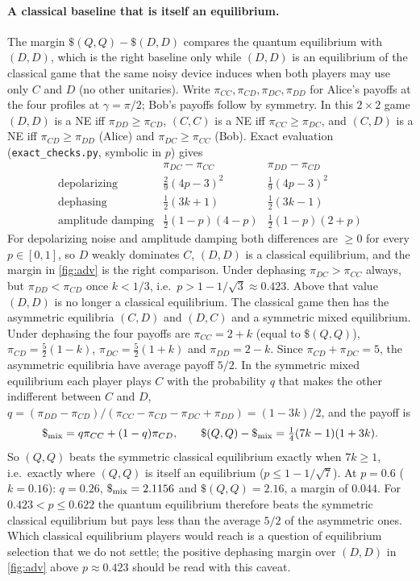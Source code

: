 \documentclass[11pt,a4paper]{article}
\begin{document}
\paragraph{A classical baseline that is itself an equilibrium.} The margin $\$(Q,Q)-\$(D,D)$ compares the quantum equilibrium with $(D,D)$, which is the right baseline only while $(D,D)$ is an equilibrium of the classical game that the same noisy device induces when both players may use only $C$ and $D$ (no other unitaries). Write $\pi_{CC},\pi_{CD},\pi_{DC},\pi_{DD}$ for Alice's payoffs at the four profiles at $\gamma=\pi/2$; Bob's payoffs follow by symmetry. In this $2\times2$ game $(D,D)$ is a NE iff $\pi_{DD}\ge \pi_{CD}$, $(C,C)$ is a NE iff $\pi_{CC}\ge \pi_{DC}$, and $(C,D)$ is a NE iff $\pi_{CD}\ge \pi_{DD}$ (Alice) and $\pi_{DC}\ge \pi_{CC}$ (Bob). Exact evaluation (\texttt{exact\_checks.py}, symbolic in $p$) gives
\[
\begin{array}{lcc}
 & \pi_{DC}-\pi_{CC} & \pi_{DD}-\pi_{CD}\\[2pt]
\text{depolarizing} & \frac29(4p-3)^2 & \frac19(4p-3)^2\\[2pt]
\text{dephasing} & \frac12(3k+1) & \frac12(3k-1)\\[2pt]
\text{amplitude damping} & \frac12(1-p)(4-p) & \frac12(1-p)(2+p)
\end{array}
\]
For depolarizing noise and amplitude damping both differences are $\ge0$ for every $p\in[0,1]$, so $D$ weakly dominates $C$, $(D,D)$ is a classical equilibrium, and the margin in \cref{fig:adv} is the right comparison. Under dephasing $\pi_{DC}>\pi_{CC}$ always, but $\pi_{DD}<\pi_{CD}$ once $k<1/3$, i.e.\ $p>1-1/\sqrt3\approx0.423$. Above that value $(D,D)$ is no longer a classical equilibrium. The classical game then has the asymmetric equilibria $(C,D)$ and $(D,C)$ and a symmetric mixed equilibrium. Under dephasing the four payoffs are $\pi_{CC}=2+k$ (equal to $\$(Q,Q)$), $\pi_{CD}=\frac52(1-k)$, $\pi_{DC}=\frac52(1+k)$ and $\pi_{DD}=2-k$. Since $\pi_{CD}+\pi_{DC}=5$, the asymmetric equilibria have average payoff $5/2$. In the symmetric mixed equilibrium each player plays $C$ with the probability $q$ that makes the other indifferent between $C$ and $D$, $q=(\pi_{DD}-\pi_{CD})/(\pi_{CC}-\pi_{CD}-\pi_{DC}+\pi_{DD})=(1-3k)/2$, and the payoff is
\[
\$_{\rm mix}=q\pi_{CC}+(1-q)\pi_{CD},\qquad \$(Q,Q)-\$_{\rm mix}=\tfrac14(7k-1)(1+3k).
\]
So $(Q,Q)$ beats the symmetric classical equilibrium exactly when $7k\ge1$, i.e.\ exactly where $(Q,Q)$ is itself an equilibrium ($p\le1-1/\sqrt7$). At $p=0.6$ ($k=0.16$): $q=0.26$, $\$_{\rm mix}=2.1156$ and $\$(Q,Q)=2.16$, a margin of $0.044$. For $0.423<p\le0.622$ the quantum equilibrium therefore beats the symmetric classical equilibrium but pays less than the average $5/2$ of the asymmetric ones. Which classical equilibrium players would reach is a question of equilibrium selection that we do not settle; the positive dephasing margin over $(D,D)$ in \cref{fig:adv} above $p\approx0.423$ should be read with this caveat.
\end{document}
